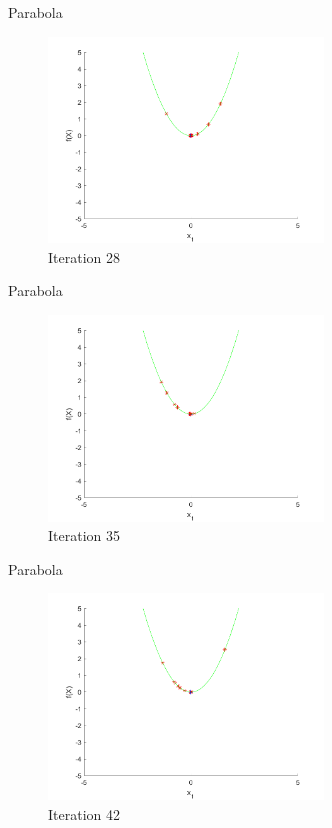 \documentclass[xcolor=table]{beamer}
\begin{document}
\begin{frame}{Parabola}
  \begin{figure}[h]
  \begin{center}
    \includegraphics[width=0.65\textwidth]{img/smpl/circ/loa-iter-28}
    \caption{Iteration 28}
  \end{center}
  \end{figure}
\end{frame}
\begin{frame}{Parabola}
  \begin{figure}[h]
  \begin{center}
    \includegraphics[width=0.65\textwidth]{img/smpl/circ/loa-iter-35}
    \caption{Iteration 35}
  \end{center}
  \end{figure}
\end{frame}
\begin{frame}{Parabola}
  \begin{figure}[h]
  \begin{center}
    \includegraphics[width=0.65\textwidth]{img/smpl/circ/loa-iter-42}
    \caption{Iteration 42}
  \end{center}
  \end{figure}
\end{frame}
\end{document}
